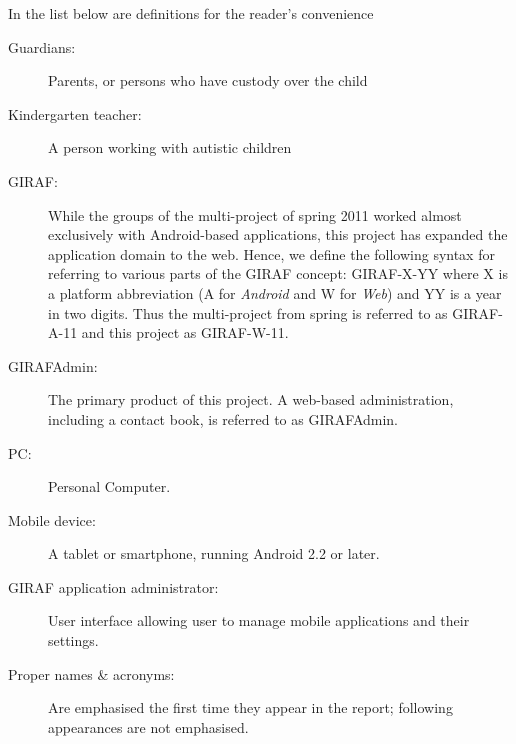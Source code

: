 In the list below are definitions for the reader's convenience
\begin{description}
\item[Guardians:] Parents, or persons who have custody over the child
\item[Kindergarten teacher:] A person working with autistic children
\item[GIRAF:] While the groups of the multi-project of spring 2011 worked almost exclusively with Android-based applications, this project has expanded the application domain to the web. Hence, we define the following syntax for referring to various parts of the GIRAF concept: GIRAF-X-YY where X is a platform abbreviation (A for \emph{Android} and W for \emph{Web}) and YY is a year in two digits. Thus the multi-project from spring is referred to as GIRAF-A-11 and this project as GIRAF-W-11.
\item[GIRAFAdmin:] The primary product of this project. A web-based administration, including a contact book, is referred to as GIRAFAdmin.
\item[PC:] Personal Computer.
\item[Mobile device:] A tablet or smartphone, running Android 2.2 or later.
\item[GIRAF application administrator:] User interface allowing user to manage mobile applications and their settings.
\item[Proper names \& acronyms:] Are emphasised the first time they appear in the report; following appearances are not emphasised.
\end{description}


